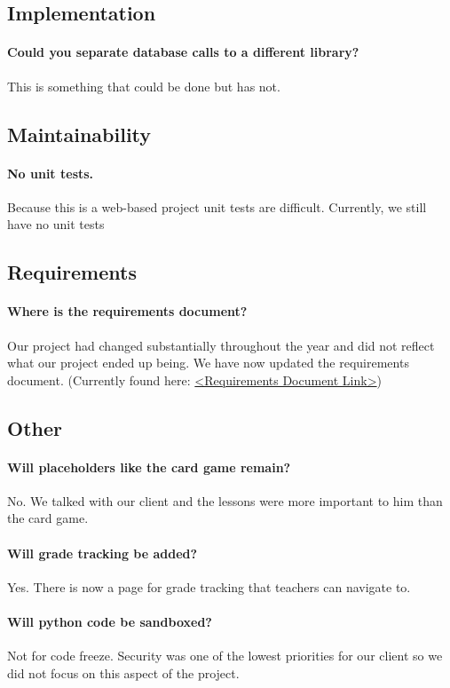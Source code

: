 \documentclass[draftclsnofoot,10pt,onecolumn]{IEEEtran}
\begin{document}
\subsection{Implementation}
\paragraph{Could you separate database calls to a different library?}
This is something that could be done but has not.
\subsection{Maintainability}
\paragraph{No unit tests.}
Because this is a web-based project unit tests are difficult. Currently, we still have no unit tests
\subsection{Requirements}
\paragraph{Where is the requirements document?}
Our project had changed substantially throughout the year and did not reflect what our project ended up being. We have now updated the requirements document. (Currently found here: \href{https://github.com/foshay/programming-for-kids/wiki/Requirements_2_0.pdf}{<Requirements Document Link>})
\subsection{Other}
\paragraph{Will placeholders like the card game remain?}
No. We talked with our client and the lessons were more important to him than the card game.
\paragraph{Will grade tracking be added?}
Yes. There is now a page for grade tracking that teachers can navigate to.
\paragraph{Will python code be sandboxed?}
Not for code freeze. Security was one of the lowest priorities for our client so we did not focus on this aspect of the project.
\end{document}
